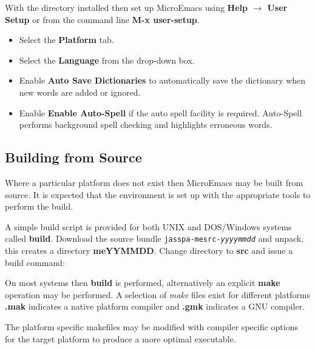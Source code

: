 \documentclass[11pt,a4paper,pdftex]{article}
\begin{document}
  With the directory installed then set up MicroEmacs using \textbf{Help
  $\rightarrow$ User Setup} or from the command line \textbf{M-x user-setup}.

  \begin{itemize}
    \item Select the \textbf{Platform} tab.

    \item Select the \textbf{Language} from the drop-down box.

    \item Enable \textbf{Auto Save Dictionaries} to automatically save the
    dictionary when new words are added or ignored.

    \item Enable \textbf{Enable Auto-Spell} if the auto spell facility is
    required. Auto-Spell performs background spell checking and highlights
    erroneous words.

  \end{itemize}

\subsection{Building from Source}

  Where a particular platform does not exist then MicroEmacs may be built from
  source. It is expected that the environment is set up with the appropriate
  tools to perform the build.

  A simple build script is provided for both UNIX and DOS/Windows systems
  called \textbf{build}. Download the source bundle
  \texttt{jasspa-mesrc-\textit{yyyymmdd}} and unpack, this creates a directory
  \textbf{meYYMMDD}. Change directory to \textbf{src} and issue a build
  command:



  On most systems then \textbf{build} is performed, alternatively an explicit
  \textbf{make} operation may be performed. A selection of \textit{make} files
  exist for different platforms \textbf{.mak} indicates a native platform
  compiler and \textbf{.gmk} indicates a GNU compiler.


  The platform specific makefiles may be modified with compiler specific
  options for the target platform to produce a more optimal executable.
\end{document}

